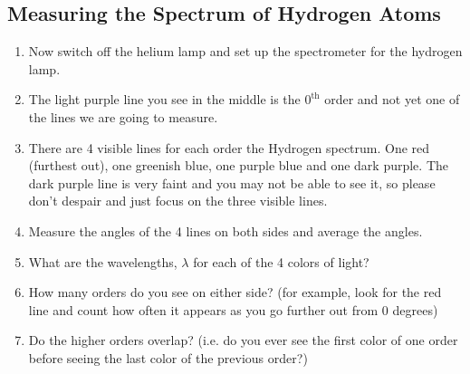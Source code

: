 \subsection{Measuring the Spectrum of Hydrogen Atoms}
\begin{enumerate}
\item Now switch off the helium lamp and set up the spectrometer for the hydrogen lamp.

\item The light purple line you see in the middle is the $0^{\mathrm{th}}$ order and not yet one of the lines we are going to measure.

\item There are 4 visible lines for each order the Hydrogen spectrum. One red (furthest out), one greenish blue, one purple blue and one dark purple. The dark purple line is very faint and you may not be able to see it, so please don't despair and just focus on the three visible lines.

\item Measure the angles of the 4 lines on both sides and average the angles.

\item What are the wavelengths, $\lambda$ for each of the 4 colors of light?

\item How many orders do you see on either side? (for example, look for the red line and count how often it appears as you go further out from $0$ degrees)

\item Do the higher orders overlap? (i.e. do you ever see the first color of one order before seeing the last color of the previous order?)
\end{enumerate}

